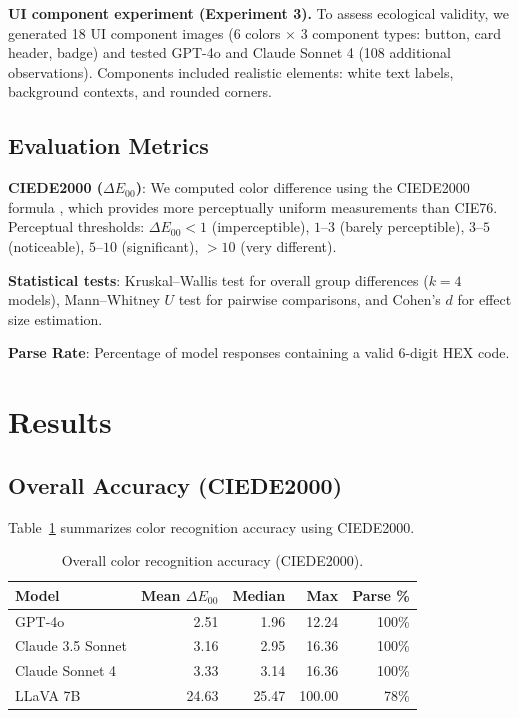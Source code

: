 \documentclass[11pt,a4paper]{article}
\begin{document}
\textbf{UI component experiment (Experiment 3).} To assess ecological validity, we generated 18 UI component images (6 colors $\times$ 3 component types: button, card header, badge) and tested GPT-4o and Claude Sonnet 4 (108 additional observations). Components included realistic elements: white text labels, background contexts, and rounded corners.

\subsection{Evaluation Metrics}

\textbf{CIEDE2000 ($\Delta E_{00}$)}: We computed color difference using the CIEDE2000 formula \cite{ciede2000}, which provides more perceptually uniform measurements than CIE76. Perceptual thresholds: $\Delta E_{00} < 1$ (imperceptible), $1$--$3$ (barely perceptible), $3$--$5$ (noticeable), $5$--$10$ (significant), $> 10$ (very different).

\textbf{Statistical tests}: Kruskal--Wallis test for overall group differences ($k = 4$ models), Mann--Whitney $U$ test for pairwise comparisons, and Cohen's $d$ for effect size estimation.

\textbf{Parse Rate}: Percentage of model responses containing a valid 6-digit HEX code.

\section{Results}

\subsection{Overall Accuracy (CIEDE2000)}

Table~\ref{tab:overall} summarizes color recognition accuracy using CIEDE2000.

\begin{table}[H]
\centering
\caption{Overall color recognition accuracy (CIEDE2000).}
\label{tab:overall}
\begin{tabular}{lrrrr}
\toprule
\textbf{Model} & \textbf{Mean $\Delta E_{00}$} & \textbf{Median} & \textbf{Max} & \textbf{Parse \%} \\
\midrule
GPT-4o & 2.51 & 1.96 & 12.24 & 100\% \\
Claude 3.5 Sonnet & 3.16 & 2.95 & 16.36 & 100\% \\
Claude Sonnet 4 & 3.33 & 3.14 & 16.36 & 100\% \\
LLaVA 7B & 24.63 & 25.47 & 100.00 & 78\% \\
\bottomrule
\end{tabular}
\end{table}
\end{document}
